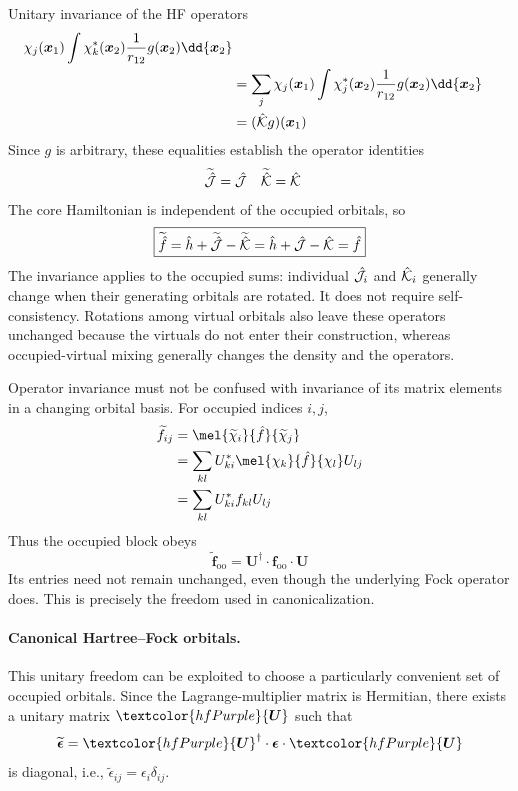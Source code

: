\documentclass[11pt,a4paper,titlepage]{article}
\numberwithin{equation}{section}
\newcommand{\bff}{\boldsymbol{f}}
\newcommand{\bx}{\boldsymbol{x}}
\newcommand{\bU}{\boldsymbol{U}}
\newcommand{\beps}{\boldsymbol{\epsilon}}
\newcommand{\hh}{\Hat{h}}
\newcommand{\hf}{\Hat{f}}
\newcommand{\chJ}{\Hat{\mathcal{J}}}
\newcommand{\chK}{\Hat{\mathcal{K}}}
\newcommand{\purple}[1]{\textcolor{hfPurple}{#1}}
\begin{document}
\begin{hfsolution}{Unitary invariance of the HF operators}
\begin{equation}
\begin{split}
    \chi_j(\bx_1)\int\chi_k^*(\bx_2)\frac{1}{r_{12}}
      g(\bx_2)\dd{\bx_2}\\
  &=\sum_j\chi_j(\bx_1)\int\chi_j^*(\bx_2)\frac{1}{r_{12}}
      g(\bx_2)\dd{\bx_2}\\
  &=(\chK g)(\bx_1)
\end{split}
\end{equation}
Since $g$ is arbitrary, these equalities establish the operator identities
\begin{align}
  \widetilde{\chJ}&=\chJ
  &\widetilde{\chK}&=\chK
\end{align}
The core Hamiltonian is independent of the occupied orbitals, so
\begin{equation}
  \boxed{
  \widetilde{\hf}
  =\hh+\widetilde{\chJ}-\widetilde{\chK}
  =\hh+\chJ-\chK
  =\hf
  }
\end{equation}
The invariance applies to the occupied sums: individual $\chJ_i$ and
$\chK_i$ generally change when their generating orbitals are rotated.
It does not require self-consistency. Rotations among virtual orbitals also
leave these operators unchanged because the virtuals do not enter their
construction, whereas occupied-virtual mixing generally changes the density
and the operators.

Operator invariance must not be confused with invariance of its matrix
elements in a changing orbital basis. For occupied indices $i,j$,
\begin{equation}
\begin{split}
  \widetilde f_{ij}
  &=\mel{\widetilde\chi_i}{\hf}{\widetilde\chi_j}\\
  &=\sum_{kl}U_{ki}^*\mel{\chi_k}{\hf}{\chi_l}U_{lj}\\
  &=\sum_{kl}U_{ki}^*f_{kl}U_{lj}
\end{split}
\end{equation}
Thus the occupied block obeys
\begin{equation}
  \widetilde{\bff}_\text{oo}
  =\bU^\dag\cdot\bff_\text{oo}\cdot\bU
\end{equation}
Its entries need not remain unchanged, even though the underlying Fock
operator does. This is precisely the freedom used in canonicalization.
\end{hfsolution}

\paragraph{Canonical Hartree--Fock orbitals.}

This unitary freedom can be exploited to choose a particularly convenient
set of occupied orbitals. Since the Lagrange-multiplier matrix is Hermitian,
there exists a unitary matrix $\purple{\bU}$ such that
\begin{equation}
  \widetilde{\beps}
  =
  \purple{\bU}^{\dag}
  \cdot
  \beps
  \cdot
  \purple{\bU}
\end{equation}
is diagonal, i.e.,
$\widetilde{\epsilon}_{ij} = \epsilon_i\delta_{ij}$.
\end{document}
